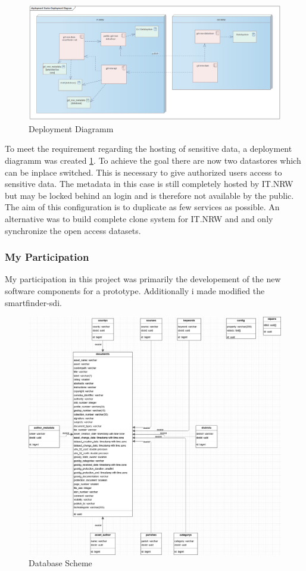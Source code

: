 \documentclass[11pt, titlepage, a4paper]{article}
\begin{document}
\begin{figure}[t]
	\caption{Deployment Diagramm}
	\label{fig:deployment}
	\includegraphics[width=16cm]{deployment.png}
	\centering
\end{figure}

To meet the requirement regarding the hosting of sensitive data, a deployment diagramm was created \ref{fig:deployment}. To achieve the goal there are now two datastores which can be inplace switched. This is necessary to give authorized users access to sensitive data. The metadata in this case is still completely hosted by IT.NRW but may be locked behind an login and is therefore not available by the public. The aim of this configuration is to duplicate as few services as possible.
An alternative was to build complete clone system for IT.NRW and  and only synchronize the open access datasets.

\subsubsection{My Participation}
My participation in this project was primarily the developement of the new software components for a prototype. Additionally i made modified the smartfinder-sdi. 

\begin{figure}[t]
	\caption{Database Scheme}
	\label{fig:db}
	\includegraphics[width=16cm]{db3.png}
	\centering
\end{figure}
\end{document}
